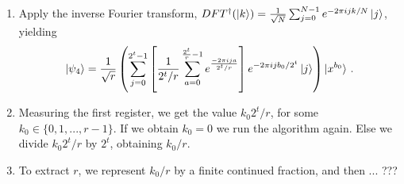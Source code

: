 \documentclass{article}
\begin{document}
\begin{enumerate}
\item Apply the inverse Fourier transform, $DFT^{\dagger}(\ket{k}) =
  \frac{1}{\sqrt{N}}\sum_{j=0}^{N-1}e^{- 2\pi i jk/N}\ket{j}$, yielding
  \begin{equation}
    \ket{\psi_4}
    = \frac{1}{\sqrt{r}}\left(\sum_{j=0}^{2^t-1}
      \left[\frac{1}{2^{t}/r}\sum_{a=0}^{\frac{2^t}{r}-1}e^{\frac{- 2\pi ija}{2^{t}/r}}\right]
      e^{- 2\pi ijb_{0}/2^t}\ket{j}\right)\ket{x^{b_0}}
    \,.
  \end{equation}

\item Measuring the first register, we get the value $k_{0}2^{t}/r$, for some
  $k_{0} \in \{ 0, 1, ..., r-1 \}$. If we obtain $k_{0} = 0$ we run the
  algorithm again. Else we divide $k_{0}2^{t}/r$ by $2^{t}$, obtaining $k_{0}/r$.

\item To extract $r$, we represent $k_{0}/r$ by a finite continued fraction,
  and then ... ???

\end{enumerate}
\end{document}
